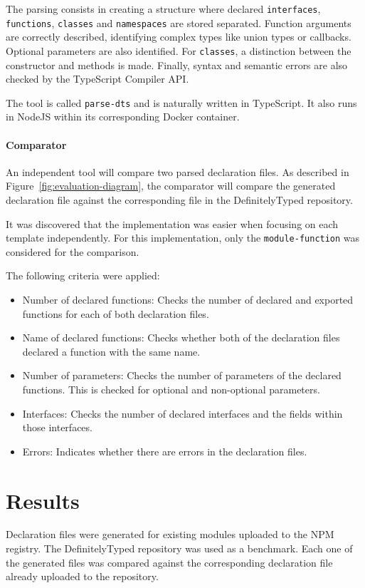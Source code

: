 \documentclass[a4paper,english,cleveref, autoref]{lipics-v2019}
\newcommand{\figref}[1]{Figure~\ref{#1}}
\begin{document}
The parsing consists in creating a structure where declared \lstinline{interfaces}, \lstinline{functions}, \lstinline{classes} and \lstinline{namespaces} are stored separated. Function arguments are correctly described, identifying complex types like union types or callbacks. Optional parameters are also identified. For \lstinline{classes}, a distinction between the constructor and methods is made. Finally, syntax and semantic errors are also checked by the TypeScript Compiler API.

The tool is called \lstinline{parse-dts} and is naturally written in TypeScript. It also runs in NodeJS within its corresponding Docker container.

\paragraph*{Comparator}
An independent tool will compare two parsed declaration files. As described in \figref{fig:evaluation-diagram}, the comparator will compare the generated declaration file against the corresponding file in the DefinitelyTyped repository.

It was discovered that the implementation was easier when focusing on each template independently. For this implementation, only the \lstinline{module-function} was considered for the comparison.

The following criteria were applied:
\begin{itemize}
  \item Number of declared functions: Checks the number of declared and exported functions for each of both declaration files.
  \item Name of declared functions: Checks whether both of the declaration files declared a function with the same name.
  \item Number of parameters: Checks the number of parameters of the declared functions. This is checked for optional and non-optional parameters.
  \item Interfaces: Checks the number of declared interfaces and the fields within those interfaces.
  \item Errors: Indicates whether there are errors in the declaration files.
\end{itemize}

\section{Results}
Declaration files were generated for existing modules uploaded to the NPM registry. The DefinitelyTyped repository was used as a benchmark. Each one of the generated files was compared against the corresponding declaration file already uploaded to the repository.
\end{document}
